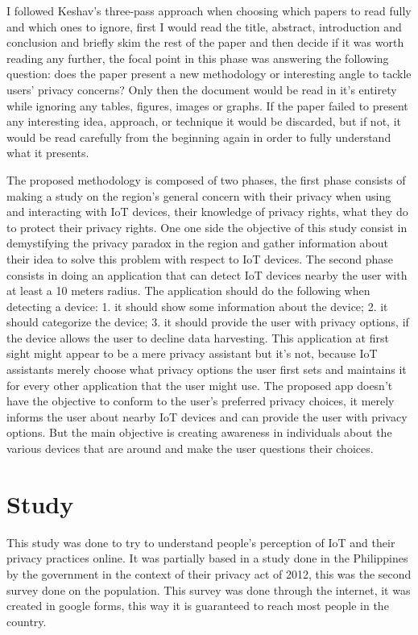 \documentclass[conference]{IEEEtran}
\begin{document}
I followed Keshav's three-pass approach \cite{KeshavHow} when choosing which
papers to read fully and which ones to ignore, first I would read the title,
abstract, introduction and conclusion and briefly skim the rest of the paper
and then decide if it was worth reading any further, the focal point in this
phase was answering the following question: does the paper present a new
methodology or interesting angle to tackle users' privacy concerns? Only then
the document would be read in it's entirety while ignoring any tables, figures,
images or graphs. If the paper failed to present any interesting idea, approach,
or technique it would be discarded, but if not, it would be read carefully
from the beginning again in order to fully understand what it presents.

The proposed methodology is composed of two phases, the first phase consists
of making a study on the region's general concern with their privacy when using
and interacting with IoT devices, their knowledge of privacy rights, what they
do to protect their privacy rights. One one side the objective of this study
consist in demystifying the privacy paradox in the region and gather information
about their idea to solve this problem with respect to IoT devices. The second
phase consists in doing an application that can detect IoT devices nearby the
user with at least a 10 meters radius. The application should do the following
when detecting a device:
1. it should show some information about the device;
2. it should categorize the device;
3. it should provide the user with privacy options, if the device allows the
user to decline data harvesting.
This application at first sight might appear to be a mere privacy assistant but
it's not, because IoT assistants merely choose what privacy options the user
first sets and maintains it for every other application that the user might use.
The proposed app doesn't have the objective to conform to the user's preferred
privacy choices, it merely informs the user about nearby IoT devices and can
provide the user with privacy options. But the main objective is creating
awareness in individuals about the various devices that are around and make the
user questions their choices.

\section{Study}

This study was done to try to understand people's perception of IoT and their
privacy practices online. It was partially based in a study done in the Philippines
by the government in the context of their privacy act of 2012, this was the second
survey done on the population. This survey was done through the internet, it
was created in google forms, this way it is guaranteed to reach most people in
the country.
\end{document}
